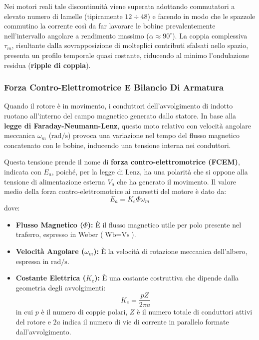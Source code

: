 ﻿\documentclass[11pt, a4paper]{article}
\begin{document}
Nei motori reali tale discontinuità viene superata adottando commutatori a elevato numero di lamelle (tipicamente \(12 \div 48\)) e facendo in modo che le spazzole commutino la corrente così da far lavorare le bobine prevalentemente nell'intervallo angolare a rendimento massimo (\(\alpha \approx 90^\circ\)). La coppia complessiva \(\tau_m\), risultante dalla sovrapposizione di molteplici contributi sfalsati nello spazio, presenta un profilo temporale quasi costante, riducendo al minimo l'ondulazione residua (\textbf{ripple di coppia}).

\subsubsection{Forza Contro-Elettromotrice E Bilancio Di Armatura}
Quando il rotore è in movimento, i conduttori dell'avvolgimento di indotto ruotano all'interno del campo magnetico generato dallo statore. In base alla \textbf{legge di Faraday-Neumann-Lenz}, questo moto relativo con velocità angolare meccanica $\omega_m$ ($\si{\radian\per\second}$) provoca una variazione nel tempo del flusso magnetico concatenato con le bobine, inducendo una tensione interna nei conduttori.

Questa tensione prende il nome di \textbf{forza contro-elettromotrice (FCEM)}, indicata con $E_a$, poiché, per la legge di Lenz, ha una polarità che si oppone alla tensione di alimentazione esterna $V_a$ che ha generato il movimento. Il valore medio della forza contro-elettromotrice ai morsetti del motore è dato da:
\[
    E_a = K_e \Phi \omega_m
\]
dove:
\begin{itemize}
    \item \textbf{Flusso Magnetico ($\Phi$):} È il flusso magnetico utile per polo presente nel traferro, espresso in Weber ($\si{\weber} = \si{\volt\second}$).
    \item \textbf{Velocità Angolare ($\omega_m$):} È la velocità di rotazione meccanica dell'albero, espressa in $\si{\radian\per\second}$.
    \item \textbf{Costante Elettrica ($K_e$):} È una costante costruttiva che dipende dalla geometria degli avvolgimenti:
    \[
        K_e = \frac{p Z}{2\pi a}
    \]
    in cui $p$ è il numero di coppie polari, $Z$ è il numero totale di conduttori attivi del rotore e $2a$ indica il numero di vie di corrente in parallelo formate dall'avvolgimento.
\end{itemize}
\end{document}
